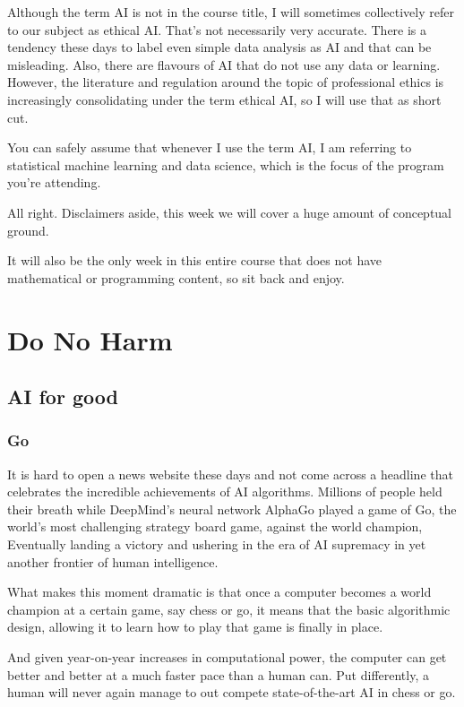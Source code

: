 \documentclass[
]{book}
\theoremstyle{definition}
\theoremstyle{definition}
\theoremstyle{definition}
\theoremstyle{definition}
\theoremstyle{remark}
\begin{document}
Although the term AI is not in the course title, I will sometimes collectively refer to our subject as ethical AI. That's not necessarily very accurate. There is a tendency these days to label even simple data analysis as AI and that can be misleading. Also, there are flavours of AI that do not use any data or learning. However, the literature and regulation around the topic of professional ethics is increasingly consolidating under the term ethical AI, so I will use that as short cut.

You can safely assume that whenever I use the term AI, I am referring to statistical machine learning and data science, which is the focus of the program you're attending.

All right. Disclaimers aside, this week we will cover a huge amount of conceptual ground.

It will also be the only week in this entire course that does not have mathematical or programming content, so sit back and enjoy.

\hypertarget{do-no-harm}{%
\section{Do No Harm}\label{do-no-harm}}

\hypertarget{ai-for-good}{%
\subsection{AI for good}\label{ai-for-good}}

\hypertarget{go}{%
\subsubsection{Go}\label{go}}

It is hard to open a news website these days and not come across a headline that celebrates the incredible achievements of AI algorithms. Millions of people held their breath while DeepMind's neural network AlphaGo played a game of Go, the world's most challenging strategy board game, against the world champion, Eventually landing a victory and ushering in the era of AI supremacy in yet another frontier of human intelligence.

What makes this moment dramatic is that once a computer becomes a world champion at a certain game, say chess or go, it means that the basic algorithmic design, allowing it to learn how to play that game is finally in place.

And given year-on-year increases in computational power, the computer can get better and better at a much faster pace than a human can. Put differently,
a human will never again manage to out compete state-of-the-art AI in chess or go.
\end{document}
